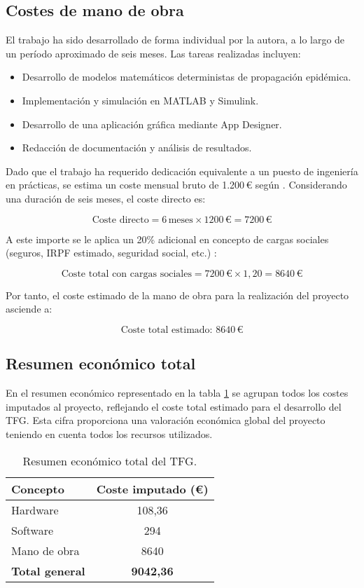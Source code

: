 \subsection{Costes de mano de obra}
El trabajo ha sido desarrollado de forma individual por la autora, a lo largo de un período aproximado de seis meses. Las tareas realizadas incluyen:

\begin{itemize}
    \item Desarrollo de modelos matemáticos deterministas de propagación epidémica.
    \item Implementación y simulación en MATLAB y Simulink.
    \item Desarrollo de una aplicación gráfica mediante App Designer.
    \item Redacción de documentación y análisis de resultados.
\end{itemize}

Dado que el trabajo ha requerido dedicación equivalente a un puesto de ingeniería en prácticas, se estima un coste mensual bruto de 1.200\,€ según \cite{ine2024etcl}. Considerando una duración de seis meses, el coste directo es:

\[
\text{Coste directo} = 6\, \text{meses} \times 1200\,\text{€} = 7200\, \text{€}
\]

A este importe se le aplica un 20\% \cite{pmi2017pmbok} adicional en concepto de cargas sociales (seguros, IRPF estimado, seguridad social, etc.) :

\[
\text{Coste total con cargas sociales} = 7200\,\text{€} \times 1{,}20 = 8640\,\text{€}
\]

Por tanto, el coste estimado de la mano de obra para la realización del proyecto asciende a:

\[
\boxed{\text{Coste total estimado: } 8640\,\text{€}}
\]







\subsection{Resumen económico total}
En el resumen económico representado en la tabla \ref{total} se agrupan todos los costes imputados al proyecto, reflejando el coste total estimado para el desarrollo del TFG. Esta cifra proporciona una valoración económica global del proyecto teniendo en cuenta todos los recursos utilizados.
\begin{table}[h]
\centering
\begin{tabular}{|l|c|}
\hline
\textbf{Concepto} & \textbf{Coste imputado (€)} \\
\hline
Hardware & 108,36 \\
Software & 294 \\
Mano de obra & 8640 \\
\hline
\textbf{Total general} & \textbf{9042,36} \\
\hline
\end{tabular}
\caption{Resumen económico total del TFG.}
\label{total}
\end{table}

